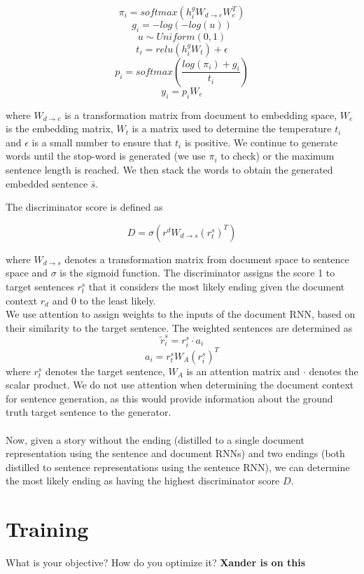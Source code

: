 \documentclass{article}
\begin{document}
$$ \pi_{i} = softmax(h^{g}_{i}W_{d \rightarrow e}W_{e}^{T})$$
$$ g_{i} = -log(-log(u)) $$
$$ u \sim Uniform(0,1) $$
$$ t_{i} = relu(h^{g}_{i}W_{t}) + \epsilon $$
$$ p_{i} = softmax(\frac{log(\pi_{i}) + g_{i}}{t_{i}}) $$
$$ y_{i} = p_{i}W_{e}$$

where $W_{d \rightarrow e}$ is a transformation matrix from document to embedding space, $W_{e}$ is the embedding matrix, $W_{t}$ is a matrix used to determine the temperature $t_{i}$ and $\epsilon$ is a small number to ensure that $t_{i}$ is positive. We continue to generate words until the stop-word is generated (we use $\pi_{i}$ to check) or the maximum sentence length is reached. We then stack the words to obtain the generated embedded sentence $\bar{s}$.

The discriminator score is defined as 

$$ D = \sigma(r^{d}W_{d \rightarrow s}(r^{s}_{t})^{T} )$$

where $W_{d \rightarrow s}$ denotes a transformation matrix from document space to sentence space and $\sigma$ is the sigmoid function. The discriminator assigns the score 1 to target sentences $r^{s}_{t}$ that it considers the most likely ending given the document context $r_{d}$ and 0 to the least likely. \\
We use attention to assign weights to the inputs of the document RNN, based on their similarity to the target sentence. The weighted sentences are determined as
$$ \tilde{r}^{s}_{i} = r^{s}_{i} \cdot a_{i} $$
$$ a_{i} = r^{s}_{t}W_{A}(r^{s}_{i})^{T} $$
where $r^{s}_{t}$ denotes the target sentence, $W_{A}$ is an attention matrix and $\cdot$ denotes the scalar product. We do not use attention when determining the document context for sentence generation, as this would provide information about the ground truth target sentence to the generator.\\ \\
Now, given a story without the ending (distilled to a single document representation using the sentence and document RNNs) and two endings (both distilled to sentence representations using the sentence RNN), we can determine the most likely ending as having the highest discriminator score $D$. 

\section{Training}
What is your objective? How do you optimize it?
\textbf{Xander is on this} \\
\end{document}
